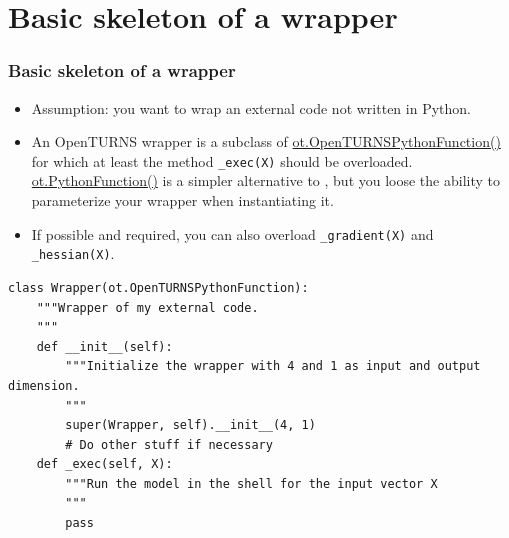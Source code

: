 \documentclass[10pt, aspectratio=169]{beamer}
\begin{document}
\section{Basic skeleton of a wrapper}
\label{sec-3}
\begin{frame}[fragile]
\frametitle{Basic skeleton of a wrapper}
\begin{itemize}
\item Assumption: you want to wrap an external code not written in Python.
\item An OpenTURNS wrapper is a subclass of \href{http://doc.openturns.org/openturns-latest/sphinx/user_manual/_generated/openturns.OpenTURNSPythonFunction.html}{ot.OpenTURNSPythonFunction()}
  for which at least the method \texttt{\_exec(X)} should be
  overloaded.  \href{http://doc.openturns.org/openturns-latest/sphinx/user_manual/_generated/openturns.PythonFunction.html}{ot.PythonFunction()} is a simpler alternative to
  , but you loose the ability to parameterize your wrapper when instantiating it.  
   
\item If possible and required, you can also overload \texttt{\_gradient(X)} and \texttt{\_hessian(X)}.
\end{itemize}
\vfill
\begin{Verbatim}[xleftmargin=10mm]
class Wrapper(ot.OpenTURNSPythonFunction):
    """Wrapper of my external code.
    """
    def __init__(self):
        """Initialize the wrapper with 4 and 1 as input and output dimension.
        """
        super(Wrapper, self).__init__(4, 1)
        # Do other stuff if necessary
    def _exec(self, X):
        """Run the model in the shell for the input vector X
        """
        pass
\end{Verbatim}
\end{frame}
\end{document}
